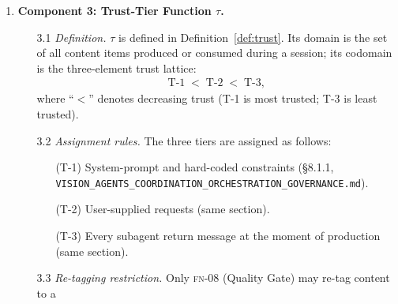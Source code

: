 \documentclass[12pt]{article}
\theoremstyle{definition}
\newcommand{\code}[1]{\texttt{#1}}
\newcommand{\FN}[1]{\textsc{fn-#1}}
\newcommand{\VisionGov}{\code{VISION\_AGENTS\_\allowbreak COORDINATION\_\allowbreak ORCHESTRATION\_\allowbreak GOVERNANCE.md}}
\begin{document}
\begin{enumerate}
\begin{enumerate}
               the Quality Gate; $\mathrm{Escalated}$ denotes
               circuit-breaker activation (\S5.3.2,
               \VisionGov{}).
    \item[2.7] \emph{Finiteness.}
               $|Q| = 8 < \infty$; $|\Sigma| < \infty$ (by
               Definition~\ref{def:state-machine} and the governance
               document); $|\delta| = |Q \times \Sigma| < \infty$.
    \item[2.8] \emph{Termination.}
               Every run terminates within at most $P + B$
               state-machine transitions.
               Proof: Theorem~\ref{thm:rework}
               (Section~\ref{sec:proofs}).
  \end{enumerate}

  \item \textbf{Component 3: Trust-Tier Function $\tau$.}
  \begin{enumerate}
    \item[3.1] \emph{Definition.}
               $\tau$ is defined in Definition~\ref{def:trust}.  Its
               domain is the set of all content items produced or
               consumed during a session; its codomain is the
               three-element trust lattice:
               \begin{align}
                 \mathrm{T\text{-}1}
                 \;<\; \mathrm{T\text{-}2}
                 \;<\; \mathrm{T\text{-}3},
                 \label{eq:trust-order}
               \end{align}
               where ``$<$'' denotes decreasing trust (T-1 is most
               trusted; T-3 is least trusted).
    \item[3.2] \emph{Assignment rules.}
               The three tiers are assigned as follows:
               \begin{enumerate}
                 \item[(T-1)] System-prompt and hard-coded constraints
                              (\S8.1.1, \VisionGov{}).
                 \item[(T-2)] User-supplied requests (same section).
                 \item[(T-3)] Every subagent return message at the
                              moment of production (same section).
               \end{enumerate}
    \item[3.3] \emph{Re-tagging restriction.}
               Only \FN{08} (Quality Gate) may re-tag content to a

\end{enumerate}
\end{enumerate}
\end{document}
